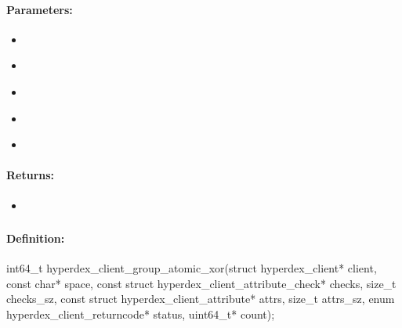 \paragraph{Parameters:}
\begin{itemize}[noitemsep]
\item {}\\

\item {}\\

\item {}\\

\item {}\\

\item {}\\

\end{itemize}

\paragraph{Returns:}
\begin{itemize}[noitemsep]
\item {}\\

\end{itemize}

\pagebreak
\subsubsection{}
\label{api:c:group_atomic_xor}


\paragraph{Definition:}
\begin{ccode}
int64_t hyperdex_client_group_atomic_xor(struct hyperdex_client* client,
        const char* space,
        const struct hyperdex_client_attribute_check* checks, size_t checks_sz,
        const struct hyperdex_client_attribute* attrs, size_t attrs_sz,
        enum hyperdex_client_returncode* status,
        uint64_t* count);
\end{ccode}

